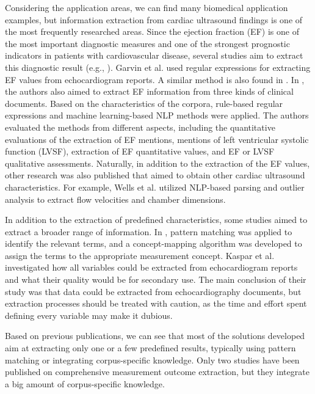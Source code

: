 Considering the application areas, we can find many biomedical application examples, but information extraction from cardiac ultrasound findings is one of the most frequently researched areas. Since the ejection fraction (EF) is one of the most important diagnostic measures and one of the strongest prognostic indicators in patients with cardiovascular disease, several studies aim to extract this diagnostic result (e.g., \cite{xie2017extracting, garvin2012automated, kim2017extraction, vaid2022using}). Garvin et al. \cite{garvin2012automated} used regular expressions for extracting EF values from echocardiogram reports. A similar method is also found in \cite{jonnalagadda2017text}. In \cite{kim2017extraction}, the authors also aimed to extract EF information from three kinds of clinical documents. Based on the characteristics of the corpora, rule-based regular expressions and machine learning-based NLP methods were applied. The authors evaluated the methods from different aspects, including the quantitative evaluations of the extraction of EF mentions, mentions of left ventricular systolic function (LVSF), extraction of EF quantitative values, and EF or LVSF qualitative assessments. Naturally, in addition to the extraction of the EF values, other research was also published that aimed to obtain other cardiac ultrasound characteristics. For example, Wells et al. \cite{wells2014extraction} utilized NLP-based parsing and outlier analysis to extract flow velocities and chamber dimensions. 

In addition to the extraction of predefined characteristics, some studies aimed to extract a broader range of information. In \cite{patterson2017unlocking}, pattern matching was applied to identify the relevant terms, and a concept-mapping algorithm was developed to assign the terms to the appropriate measurement concept. Kaspar et al. \cite{kaspar2019information} investigated how all variables could be extracted from echocardiogram reports and what their quality would be for secondary use. The main conclusion of their study was that data could be extracted from echocardiography documents, but extraction processes should be treated with caution, as the time and effort spent defining every variable may make it dubious.

Based on previous publications, we can see that most of the solutions developed aim at extracting only one or a few predefined results, typically using pattern matching or integrating corpus-specific knowledge. Only two studies \cite{patterson2017unlocking, kaspar2019information} have been published on comprehensive measurement outcome extraction, but they integrate a big amount of corpus-specific knowledge.

